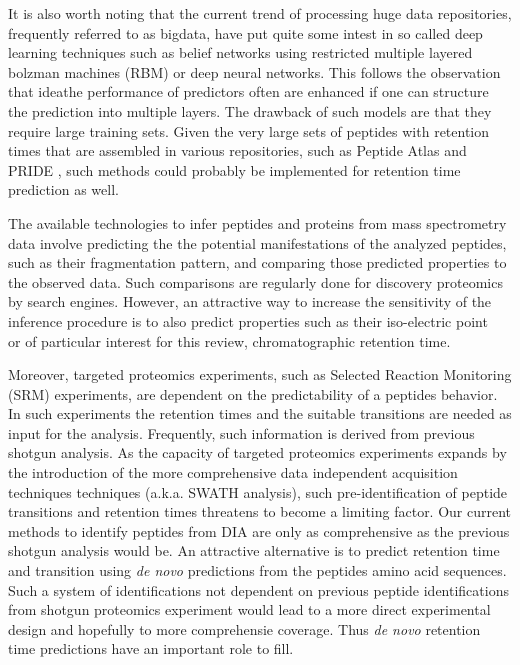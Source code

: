 \documentclass[a4paper]{article}
\begin{document}
It is also worth noting that the current trend of processing huge data
repositories, frequently referred to as bigdata, have put quite some
intest in so called deep learning techniques such as belief networks
using restricted multiple layered bolzman machines (RBM)
\cite{salakhutdinov2009deep} or deep neural networks. This follows the
observation that ideathe performance of predictors often are enhanced
if one can structure the prediction into multiple layers. The drawback
of such models are that they require large training sets. Given the
very large sets of peptides with retention times that are assembled in
various repositories, such as Peptide Atlas \cite{desiere2006peptideatlas} and
PRIDE \cite{martens2005pride}, such methods could probably be
implemented for retention time prediction as well.

The available technologies to infer peptides and proteins from mass
spectrometry data involve predicting the the potential manifestations
of the analyzed peptides, such as their fragmentation pattern, and
comparing those predicted properties to the observed data. Such
comparisons are regularly done for discovery proteomics by search
engines. However, an attractive way to increase the sensitivity of the
inference procedure is to also predict properties such as their
iso-electric point~\cite{branca2014hirief} or of particular interest
for this review, chromatographic retention
time\cite{cerqueira2010mude}. 

Moreover, targeted proteomics experiments, such as Selected Reaction
Monitoring (SRM) experiments, are dependent on the predictability of a
peptides behavior. In such experiments the retention times and the
suitable transitions are needed as input for the analysis. Frequently,
such information is derived from previous shotgun analysis. As the
capacity of targeted proteomics experiments expands by the
introduction of the more comprehensive data independent acquisition
techniques techniques \cite{Venable2004} (a.k.a. SWATH analysis), such
pre-identification of peptide transitions and retention times
threatens to become a limiting factor. Our current methods to identify
peptides from DIA are only as comprehensive as the previous shotgun
analysis would be. An attractive alternative is to predict retention
time and transition using {\em de novo} predictions from the peptides
amino acid sequences.  Such a system of identifications not dependent
on previous peptide identifications from shotgun proteomics experiment
would lead to a more direct experimental design and hopefully to more
comprehensie coverage. Thus {\em de novo} retention time predictions
have an important role to fill.




\end{document}
